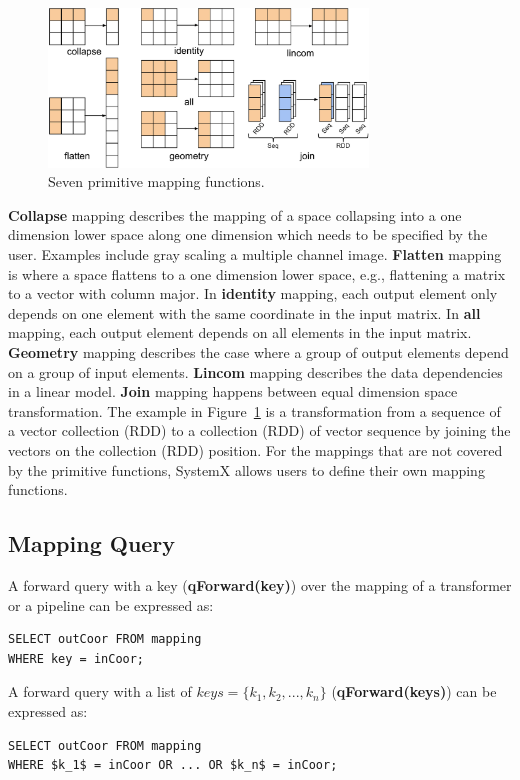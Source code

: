 \documentclass{sig-alternate}
\begin{document}
\begin{figure}[t]
\begin{center}
    \includegraphics[width=85mm]{pictures/narrowmapping}
\caption {Seven primitive mapping functions.
    \label{fig:narrowmapping}
}
\end{center}
\end{figure}

{\bf Collapse} mapping describes the mapping of a space collapsing into a one dimension lower space along one dimension which needs
to be specified by the user. Examples include gray scaling a multiple channel image.
{\bf Flatten} mapping is where a space flattens to a one dimension lower space, e.g., flattening a matrix to a vector with column major.
In {\bf identity} mapping, each output element only depends on one element with the same coordinate in the input matrix.
In {\bf all} mapping, each output element depends on all elements in the input matrix.
{\bf Geometry} mapping describes the case where a group of output elements depend on a group of input elements.
{\bf Lincom} mapping describes the data dependencies in a linear model.
{\bf Join} mapping happens between equal dimension space transformation. The example in Figure~\ref{fig:narrowmapping} 
is a transformation from a sequence of a vector collection (RDD) to a collection (RDD) of vector sequence by joining the vectors
on the collection (RDD) position.
For the mappings that are not covered by the primitive functions, SystemX allows users to define their own mapping functions.

\subsection{Mapping Query}
A forward query with a key  ({\bf qForward(key)}) over the mapping of a transformer or a pipeline can be expressed as:
\begin{lstlisting}
SELECT outCoor FROM mapping
WHERE key = inCoor;
\end{lstlisting}

A forward query with a list of $keys=\{k_1, k_2, ..., k_n\}$ ({\bf qForward(keys)}) can be expressed as:
\begin{lstlisting}
SELECT outCoor FROM mapping
WHERE $k_1$ = inCoor OR ... OR $k_n$ = inCoor;
\end{lstlisting}
\end{document}
